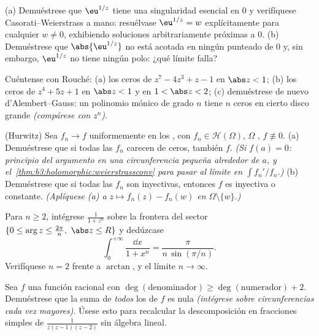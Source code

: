 \begin{exercise}[$\star\star$]\label{exo:b3:residues:6}
(a) Demuéstrese que $\eu^{1/z}$ tiene una singularidad esencial en $0$ y
verifíquese Casorati--Weierstrass a mano: resuélvase $\eu^{1/z} =
w$ explícitamente para cualquier $w \neq 0$, exhibiendo soluciones
arbitrariamente próximas a $0$. (b) Demuéstrese que $\abs{\eu^{1/z}}$ no
está acotada en ningún 
punteado de $0$ y, sin embargo, $\eu^{1/z}$ no tiene ningún polo: ¿qué
límite falla?
\end{exercise}

\begin{exercise}[$\star\star$]\label{exo:b3:residues:7}
Cuéntense con Rouché: (a) los ceros de $z^7 - 4z^3 + z - 1$ en
$\abs z < 1$; (b) los ceros de $z^4 + 5z + 1$ en $\abs z < 1$ y en $1 <
\abs z < 2$; (c) demuéstrese de nuevo d'Alembert--Gauss: un polinomio
mónico de grado $n$ tiene $n$ ceros en cierto disco grande
\emph{(compárese con
$z^n$)}.
\end{exercise}

\begin{exercise}[$\star\star\star$]\label{exo:b3:residues:8}
(Hurwitz) Sea $f_n \to f$ uniformemente en los
, con $f_n \in
\mathcal H(\Omega)$, $\Omega$
, $f \not\equiv 0$. (a)
Demuéstrese que si todas las $f_n$ carecen de ceros, también $f$.
\emph{(Si $f(a) = 0$: principio del argumento en una circunferencia
pequeña alrededor de $a$, y el~\cref{thm:b3:holomorphic:weierstrassconv}
para pasar al límite en $\int f_n'/f_n$.)} (b) Demuéstrese que si todas
las $f_n$ son inyectivas, entonces $f$ es inyectiva o constante.
\emph{(Aplíquese (a) a $z \mapsto f_n(z) - f_n(w)$ en
$\Omega\setminus\{w\}$.)}
\end{exercise}

\begin{exercise}[$\star\star\star$]\label{exo:b3:residues:9}
Para $n \geq 2$, intégrese $\frac1{1 + z^n}$ sobre la frontera del
sector $\{0 \leq \arg z \leq \frac{2\pi}n,\ \abs z
\leq R\}$ y dedúzcase
\[
\int_0^{+\infty}\frac{\dd x}{1 + x^n} =
\frac{\pi}{n\,\sin(\pi/n)} .
\]
Verifíquese $n = 2$ frente a $\arctan$, y el límite $n \to
\infty$.
\end{exercise}

\begin{exercise}[$\star\star$]\label{exo:b3:residues:10}
Sea $f$ una función racional con $\deg(\text{denominador})
\geq \deg(\text{numerador}) + 2$. Demuéstrese que la suma de
\emph{todos} los  de $f$
es nula \emph{(intégrese sobre circunferencias cada vez mayores)}. Úsese
esto para recalcular la descomposición en fracciones simples de
$\frac1{z(z-1)(z-2)}$ sin álgebra lineal.
\end{exercise}

